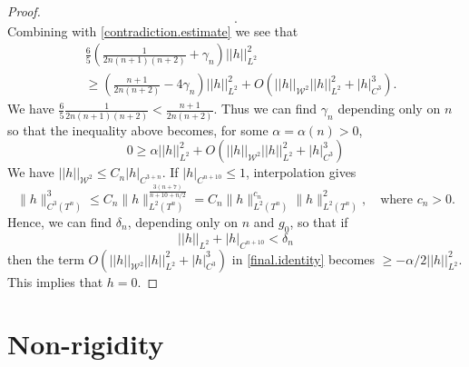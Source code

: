 \documentclass[11pt]{amsart}
\theoremstyle{remark}
\theoremstyle{definition}
\begin{document}
\begin{proof}
$$		.$$
		Combining with \eqref{contradiction.estimate} we see that
		$$
		\begin{aligned}
			&\frac{6}{5}\left(\frac{1}{2n(n+1)(n+2)}+\gamma_n\right)||h||^2_{L^2}\\
			&\geq  \left(\frac{n+1}{2n(n+2)}-4\gamma_n\right)||h||^2_{L^2}+O(||h||_{\mathcal W^2}||h||^2_{L^2}+|h|^3_{{C^3}}).
		\end{aligned}
		$$
		{We have $ \frac{6}{5}\frac{1}{2n(n+1)(n+2)}<\frac{n+1}{2n(n+2)}$. Thus we can find $\gamma_n$ depending only on $n$ so that the inequality above becomes, for some $\alpha=\alpha(n)>0$,
			\begin{equation}\label{final.identity}
				0\geq \alpha||h||^2_{L^2}+O(||h||_{\mathcal W^2}||h||^2_{L^2}+|h|^3_{{C^3}})
		\end{equation}}
		We have $||h||_{\mathcal W^2}\leq {C_{n}}|h|_{C^{3+n}}$. If $|h|_{C^{n+10}}\leq 1$, interpolation \cite[p.~125]{Nirenberg1959} gives
		$$
		\|h\|_{C^3(T^n)}^3\leq  {C_{n}}\|h\|_{L^2(T^n)}^{\frac{3(n+7)}{n+10+n/2}}={C_{n}}\|h\|_{L^2(T^n)}^{c_n}\|h\|_{L^2(T^n)}^2,\quad\text{where }c_n>0.
		$$
		Hence, we can find $\delta_n$, {depending only on $n$ and $g_0$, so that if  $$||h||_{L^2}+|h|_{C^{n+10}}<\delta_n$$ then the term
			$O(||h||_{\mathcal W^2}||h||^2_{L^2}+|h|^3_{{C^3}})$ in \eqref{final.identity} becomes $\geq - \alpha/2||h||^2_{L^2}.$ This  implies that $h=0$.}
	\end{proof}
	
	
	
	
	\section{Non-rigidity}\label{non-rigid}
	
\end{document}
